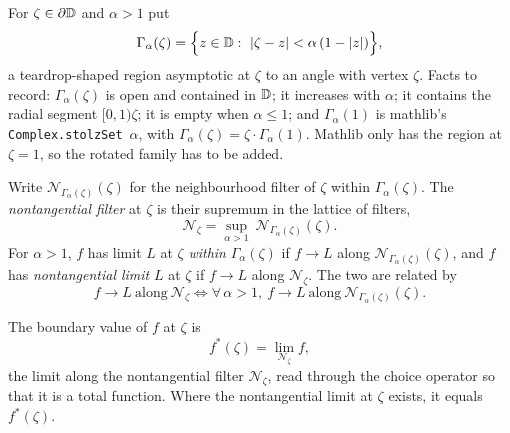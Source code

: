 \begin{definition}
  \label{def:nt_region}
  \leanok
  \mainline
  For $\zeta\in\partial\mathbb{D}$ and $\alpha>1$ put
  \[
    \Gamma_\alpha(\zeta)
      =\Bigl\{z\in\mathbb{D}:\ |\zeta-z|<\alpha\,(1-|z|)\Bigr\},
  \]
  a teardrop-shaped region asymptotic at $\zeta$ to an angle with vertex
  $\zeta$. Facts to record: $\Gamma_\alpha(\zeta)$ is open and contained in
  $\mathbb{D}$; it increases with $\alpha$; it contains the radial segment
  $[0,1)\zeta$; it is empty when $\alpha\le 1$; and
  $\Gamma_\alpha(1)$ is mathlib's \texttt{Complex.stolzSet}~$\alpha$, with
  $\Gamma_\alpha(\zeta)=\zeta\cdot\Gamma_\alpha(1)$. Mathlib only has the
  region at $\zeta=1$, so the rotated family has to be added.
\end{definition}

\begin{definition}
  \label{def:nt_limit}
  \leanok
  \mainline
  Write $\mathcal{N}_{\Gamma_\alpha(\zeta)}(\zeta)$ for the neighbourhood filter
  of $\zeta$ within $\Gamma_\alpha(\zeta)$. The \emph{nontangential filter} at
  $\zeta$ is their supremum in the lattice of filters,
  \[
    \mathcal{N}_\zeta=\sup_{\alpha>1}\ \mathcal{N}_{\Gamma_\alpha(\zeta)}(\zeta).
  \]
  For $\alpha>1$, $f$ has limit $L$ at $\zeta$ \emph{within} $\Gamma_\alpha(\zeta)$
  if $f\to L$ along $\mathcal{N}_{\Gamma_\alpha(\zeta)}(\zeta)$, and $f$ has
  \emph{nontangential limit} $L$ at $\zeta$ if $f\to L$ along
  $\mathcal{N}_\zeta$. The two are related by
  \[
    f\to L \ \text{along}\ \mathcal{N}_\zeta
    \iff
    \forall\,\alpha>1,\ f\to L \ \text{along}\ \mathcal{N}_{\Gamma_\alpha(\zeta)}(\zeta).
  \]
\end{definition}

\begin{definition}
  \label{def:boundary_function}
  \leanok
  The boundary value of $f$ at $\zeta$ is
  \[
    f^*(\zeta)=\lim_{\mathcal{N}_\zeta}f,
  \]
  the limit along the nontangential filter $\mathcal{N}_\zeta$, read through the
  choice operator so that it is a total function. Where the nontangential limit
  at $\zeta$ exists, it equals $f^*(\zeta)$.
\end{definition}

